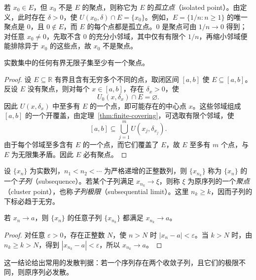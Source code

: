 若 $x_0\in E$，但 $x_0$ 不是 $E$ 的聚点，则称它为 $E$ 的\emph{孤立点}（isolated point）。由定义，此时存在 $\delta>0$，使 $U(x_0,\delta)\cap E=\{x_0\}$。例如，$E=\{1/n:n\geq1\}$ 的唯一聚点是 $0$，且 $0\notin E$，而 $E$ 的每个点都是孤立点。$0$ 是聚点可由 $1/n\to0$ 得到；对任意 $x_0\neq0$，先取不含 $0$ 的充分小邻域，其中仅有有限个 $1/n$，再缩小邻域便能排除异于 $x_0$ 的这些点，故 $x_0$ 不是聚点。

\begin{theorem}[聚点原理]
\label{thm:accumulation-point-principle}
实数集中的任何有界无限子集至少有一个聚点。
\end{theorem}

\begin{proof}
设 $E\subseteq\mathbb{R}$ 有界且含有无穷多个不同的点，取闭区间 $[a,b]$ 使 $E\subseteq[a,b]$。反设 $E$ 没有聚点，则对每个 $x\in[a,b]$，存在 $\delta_x>0$，使
\[
    U_0(x,\delta_x)\cap E=\varnothing.
\]
因此 $U(x,\delta_x)$ 中至多有 $E$ 的一个点，即可能存在的中心点 $x$。这些邻域组成 $[a,b]$ 的一个开覆盖，由定理~\ref{thm:finite-covering}，可选取有限个邻域，使
\[
    [a,b]\subseteq\bigcup_{j=1}^{m}U(x_j,\delta_{x_j}).
\]
由于每个邻域至多含有 $E$ 的一个点，而它们覆盖了 $E$，故 $E$ 至多有 $m$ 个点，与 $E$ 为无限集矛盾。因此 $E$ 必有聚点。
\end{proof}

\begin{definition}
\label{def:subsequence-and-sequence-cluster-point}
设 $\{x_n\}$ 为实数列，$n_1<n_2<\cdots$ 为严格递增的正整数列，则 $\{x_{n_k}\}$ 称为 $\{x_n\}$ 的一个\emph{子列}（subsequence）。若某个子列满足 $x_{n_k}\to\xi$，则称 $\xi$ 为原序列的一个\emph{聚点}（cluster point），也称\emph{子列极限}（subsequential limit）。这里 $n_k\geq k$，因而子列的下标必趋于无穷。
\end{definition}

\begin{theorem}[收敛序列的子列]
\label{thm:subsequence-of-convergent-sequence}
若 $x_n\to a$，则 $\{x_n\}$ 的任意子列 $\{x_{n_k}\}$ 都满足 $x_{n_k}\to a$。
\end{theorem}

\begin{proof}
对任意 $\varepsilon>0$，存在正整数 $N$，使 $n>N$ 时 $|x_n-a|<\varepsilon$。当 $k>N$ 时，由 $n_k\geq k>N$，得到 $|x_{n_k}-a|<\varepsilon$，所以 $x_{n_k}\to a$。
\end{proof}

这一结论给出常用的发散判据：若一个序列存在两个收敛子列，且它们的极限不同，则原序列必发散。

